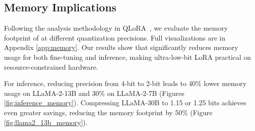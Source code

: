 \subsection{Memory Implications}
\label{subsec:memory-imp}



Following the analysis methodology in QLoRA~\cite{dettmers2024qlora}, we evaluate the memory footprint of \FWName at different quantization precisions. Full visualizations are in Appendix \ref{app:memory}. Our results show that \FWName significantly reduces memory usage for both fine-tuning and inference, making ultra-low-bit LoRA practical on resource-constrained hardware.

For inference, reducing precision from 4-bit to 2-bit leads to 40\% lower memory usage on LLaMA-2-13B and 30\% on LLaMA-2-7B (Figures \ref{fig:inference_memory}). Compressing LLaMA-30B to 1.15 or 1.25 bits achieves even greater savings, reducing the memory footprint by 50\% (Figure \ref{fig:llama2_13b_memory}).


